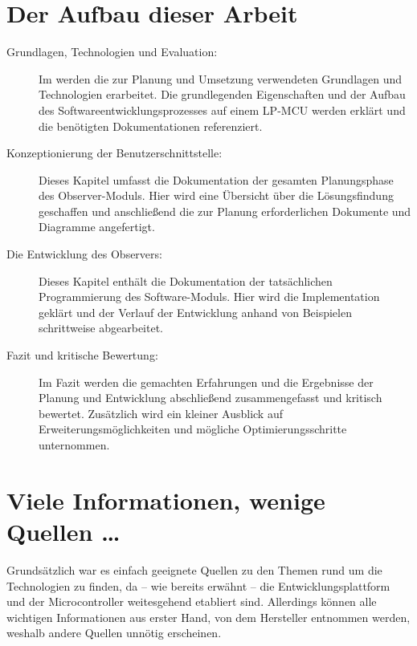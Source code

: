 \section{Der Aufbau dieser Arbeit}
\label{sec:AufbauDieserArbeit}

\begin{description}

	\item[Grundlagen, Technologien und Evaluation:] Im  werden die zur Planung und Umsetzung verwendeten Grundlagen und Technologien erarbeitet. Die grundlegenden Eigenschaften und der Aufbau des Softwareentwicklungsprozesses auf einem LP-MCU werden erkl\"art und die ben\"otigten Dokumentationen referenziert.
	
	\item[Konzeptionierung der Benutzerschnittstelle:] Dieses Kapitel umfasst die Dokumentation der gesamten Planungsphase des Observer-Moduls. Hier wird eine \"Ubersicht \"uber die L\"osungsfindung geschaffen und anschlie{\ss}end die zur Planung erforderlichen Dokumente und Diagramme angefertigt.
	
	\item[Die Entwicklung des Observers:] Dieses Kapitel enth\"alt die Dokumentation der tats\"achlichen Programmierung des Software-Moduls. Hier wird die Implementation gekl\"art und der Verlauf der Entwicklung anhand von Beispielen schrittweise abgearbeitet.
	
	\item[Fazit und kritische Bewertung:] Im Fazit werden die gemachten Erfahrungen und die Ergebnisse der Planung und Entwicklung abschlie{\ss}end zusammengefasst und kritisch bewertet. Zus\"atzlich wird ein kleiner Ausblick auf Erweiterungsm\"oglichkeiten und m\"ogliche Optimierungsschritte unternommen.

\end{description}


\section{Viele Informationen, wenige Quellen \dots}
\label{sec:Quellenlage}

Grunds\"atzlich war es einfach geeignete Quellen zu den Themen rund um die Technologien zu finden, da -- wie bereits erw\"ahnt -- die Entwicklungsplattform und der Microcontroller weitesgehend etabliert sind. Allerdings k\"onnen alle wichtigen Informationen aus erster Hand, von dem Hersteller entnommen werden, weshalb andere Quellen unn\"otig erscheinen.